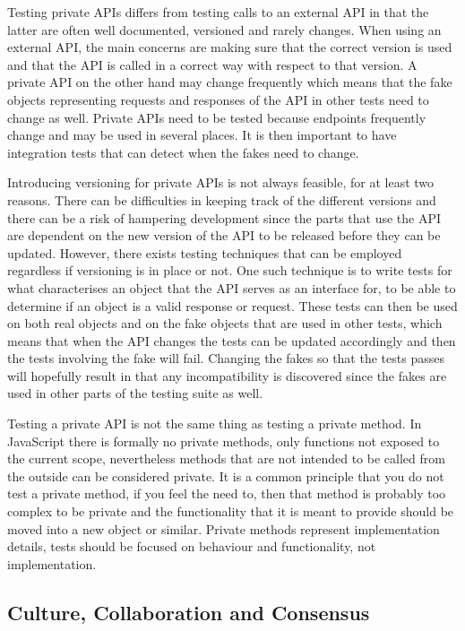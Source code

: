 \documentclass[11pt]{article}
\begin{document}
Testing private APIs differs from testing calls to an external API in that the latter are often well documented, versioned and rarely changes. When using an external API, the main concerns are making sure that the correct version is used and that the API is called in a correct way with respect to that version. A private API on the other hand may change frequently which means that the fake objects representing requests and responses of the API in other tests need to change as well. Private APIs need to be tested because endpoints frequently change and may be used in several places. It is then important to have integration tests that can detect when the fakes need to change. \cite[questions~34,~36]{Edelstam}

Introducing versioning for private APIs is not always feasible, for at least two reasons. There can be difficulties in keeping track of the different versions and there can be a risk of hampering development since the parts that use the API are dependent on the new version of the API to be released before they can be updated. However, there exists testing techniques that can be employed regardless if versioning is in place or not. One such technique is to write tests for what characterises an object that the API serves as an interface for, to be able to determine if an object is a valid response or request. These tests can then be used on both real objects and on the fake objects that are used in other tests, which means that when the API changes the tests can be updated accordingly and then the tests involving the fake will fail. Changing the fakes so that the tests passes will hopefully result in that any incompatibility is discovered since the fakes are used in other parts of the testing suite as well. \cite[question~34]{Edelstam}

Testing a private API is not the same thing as testing a private method. In JavaScript there is formally no private methods, only functions not exposed to the current scope, nevertheless methods that are not intended to be called from the outside can be considered private. It is a common principle that you do not test a private method, if you feel the need to, then that method is probably too complex to be private and the functionality that it is meant to provide should be moved into a new object or similar. Private methods represent implementation details, tests should be focused on behaviour and functionality, not implementation. \cite[questions~62-63]{Edelstam}

\subsection{Culture, Collaboration and Consensus}
\label{sec:ccc}
\end{document}
